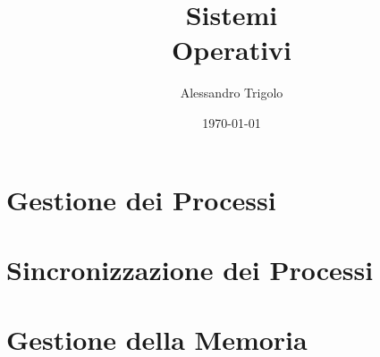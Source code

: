 \documentclass[titlepage]{article}
\title{\textbf{\fontsize{35pt}{35pt}\selectfont Sistemi\\\vspace{25pt}Operativi}}
\author{Alessandro Trigolo}
\date{\today}
\begin{document}
\maketitle

\newpage\tableofcontents

\newpage\listoffigures

\newpage\lstlistoflistings


\lstset{style = C++}

\newpage\part{Gestione dei Processi}








\newpage\part{Sincronizzazione dei Processi}






\newpage\part{Gestione della Memoria}







\end{document}
